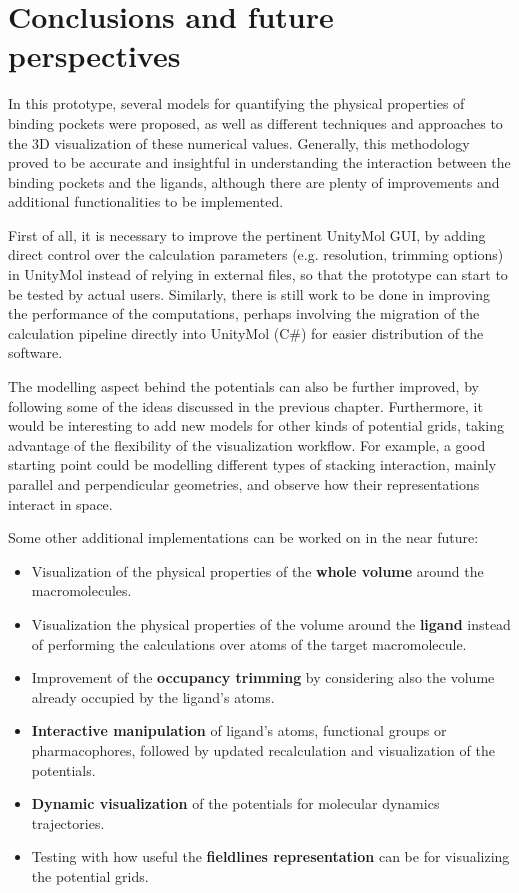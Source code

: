 \chapter{Conclusions and future perspectives} %
In this prototype, several models for quantifying the physical properties of binding pockets were proposed, as well as different techniques and approaches to the 3D visualization of these numerical values. Generally, this methodology proved to be accurate and insightful in understanding the interaction between the binding pockets and the ligands, although there are plenty of improvements and additional functionalities to be implemented.

First of all, it is necessary to improve the pertinent UnityMol GUI, by adding direct control over the calculation parameters (e.g. resolution, trimming options) in UnityMol instead of relying in external files, so that the prototype can start to be tested by actual users. Similarly, there is still work to be done in improving the performance of the computations, perhaps involving the migration of the calculation pipeline directly into UnityMol (C\#) for easier distribution of the software.

The modelling aspect behind the potentials can also be further improved, by following some of the ideas discussed in the previous chapter. Furthermore, it would be interesting to add new models for other kinds of potential grids, taking advantage of the flexibility of the visualization workflow. For example, a good starting point could be modelling different types of stacking interaction, mainly parallel and perpendicular geometries, and observe how their representations interact in space.

Some other additional implementations can be worked on in the near future:
\begin{itemize}
  \item Visualization of the physical properties of the \textbf{whole volume} around the macromolecules.
  \item Visualization the physical properties of the volume around the \textbf{ligand} instead of performing the calculations over atoms of the target macromolecule.
  \item Improvement of the \textbf{occupancy trimming} by considering also the volume already occupied by the ligand's atoms.
  \item \textbf{Interactive manipulation} of ligand's atoms, functional groups or pharmacophores, followed by updated recalculation and visualization of the potentials.
  \item \textbf{Dynamic visualization} of the potentials for molecular dynamics trajectories.
  \item Testing with how useful the \textbf{fieldlines representation} can be for visualizing the potential grids.
\end{itemize}
